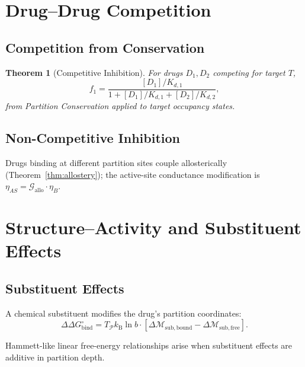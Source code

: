 \documentclass[twocolumn,10pt,a4paper]{article}
\newtheorem{theorem}{Theorem}[section]
\theoremstyle{definition}
\theoremstyle{remark}
\newcommand{\kB}{k_{\mathrm{B}}}
\newcommand{\Depth}{\mathcal{M}}
\newcommand{\Gcond}{\mathcal{G}}
\newcommand{\Partition}{\mathcal{P}}
\begin{document}
\section{Drug--Drug Competition}

\subsection{Competition from Conservation}

\begin{theorem}[Competitive Inhibition]
For drugs $D_1, D_2$ competing for target $T$,
\begin{equation}
    f_1 = \frac{[D_1]/K_{d,1}}{1 + [D_1]/K_{d,1} + [D_2]/K_{d,2}},
\end{equation}
from Partition Conservation applied to target occupancy states.
\end{theorem}

\subsection{Non-Competitive Inhibition}

Drugs binding at different partition sites couple allosterically (Theorem~\ref{thm:allostery}); the active-site conductance modification is $\eta_{AS} = \Gcond_{\mathrm{allo}}\cdot\eta_B$.

\section{Structure--Activity and Substituent Effects}

\subsection{Substituent Effects}

A chemical substituent modifies the drug's partition coordinates:
\begin{equation}
    \Delta\Delta G^\circ_{\mathrm{bind}} = T_\Partition\kB\ln b\cdot[\Delta\Depth_{\mathrm{sub,bound}} - \Delta\Depth_{\mathrm{sub,free}}].
\end{equation}

Hammett-like linear free-energy relationships arise when substituent effects are additive in partition depth.
\end{document}
